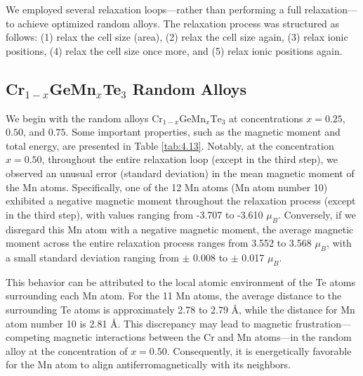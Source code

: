 We employed several relaxation loops—rather than performing a full relaxation—to achieve optimized random alloys. The relaxation process was structured as follows: (1) relax the cell size (area), (2) relax the cell size again, (3) relax ionic positions, (4) relax the cell size once more, and (5) relax ionic positions again.

\subsection{\texorpdfstring{Cr$_{1-x}$GeMn$_{x}$Te$_{3}$ Random Alloys}{Cr1-xGeMnxTe3 Random Alloys}}

We begin with the random alloys $\text{Cr}_{1-x}\text{GeMn}_{x}\text{Te}_3$ at concentrations $x = 0.25$, $0.50$, and $0.75$. Some important properties, such as the magnetic moment and total energy, are presented in Table \ref{tab:4.13}. Notably, at the concentration $x = 0.50$, throughout the entire relaxation loop (except in the third step), we observed an unusual error (standard deviation) in the mean magnetic moment of the Mn atoms. Specifically, one of the 12 Mn atoms (Mn atom number 10) exhibited a negative magnetic moment throughout the relaxation process (except in the third step), with values ranging from -3.707 to -3.610 $\mu_B$. Conversely, if we disregard this Mn atom with a negative magnetic moment, the average magnetic moment across the entire relaxation process ranges from 3.552 to 3.568 $\mu_B$, with a small standard deviation ranging from $\pm$ 0.008 to $\pm$ 0.017 $\mu_B$. 

This behavior can be attributed to the local atomic environment of the Te atoms surrounding each Mn atom. For the 11 Mn atoms, the average distance to the surrounding Te atoms is approximately 2.78 to 2.79 \AA, while the distance for Mn atom number 10 is 2.81 \AA. This discrepancy may lead to magnetic frustration—competing magnetic interactions between the Cr and Mn atoms—in the random alloy at the concentration of $x = 0.50$. Consequently, it is energetically favorable for the Mn atom to align antiferromagnetically with its neighbors.  

